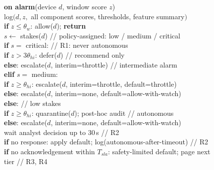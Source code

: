 \documentclass[sigconf,review,anonymous]{acmart}
\begin{document}
\begin{figure}[t]
\centering
\begin{minipage}{0.96\linewidth}
\ttfamily\small
\raggedright
\textbf{on alarm}(device $d$, window score $z$)\\
\hspace*{1em}log$(d, z,$ all component scores, thresholds, feature summary$)$\\
\hspace*{1em}\textbf{if} $z \le \theta_w$: allow($d$); \textbf{return}\\
\hspace*{1em}$s \leftarrow$ stakes($d$) \hfill // policy-assigned: low / medium / critical\\
\hspace*{1em}\textbf{if} $s =$ critical: \hfill // R1: never autonomous\\
\hspace*{2em}\textbf{if} $z > 3\theta_{hi}$: defer($d$) \hfill // recommend only\\
\hspace*{2em}\textbf{else}: escalate($d$, interim=throttle) \hfill // intermediate alarm\\
\hspace*{1em}\textbf{elif} $s =$ medium:\\
\hspace*{2em}\textbf{if} $z \ge \theta_{hi}$: escalate($d$, interim=throttle, default=throttle)\\
\hspace*{2em}\textbf{else}: escalate($d$, interim=none, default=allow-with-watch)\\
\hspace*{1em}\textbf{else}: \hfill // low stakes\\
\hspace*{2em}\textbf{if} $z \ge \theta_{hi}$: quarantine($d$); post-hoc audit \hfill // autonomous\\
\hspace*{2em}\textbf{else}: escalate($d$, interim=none, default=allow-with-watch)\\
\hspace*{1em}wait analyst decision up to 30\,s \hfill // R2\\
\hspace*{1em}\textbf{if} no response: apply default; log(autonomous-after-timeout) \hfill // R2\\
\hspace*{1em}\textbf{if} no acknowledgement within $T_{sla}$: safety-limited default; page next tier \hfill // R3, R4\\

\end{minipage}
\end{figure}
\end{document}
